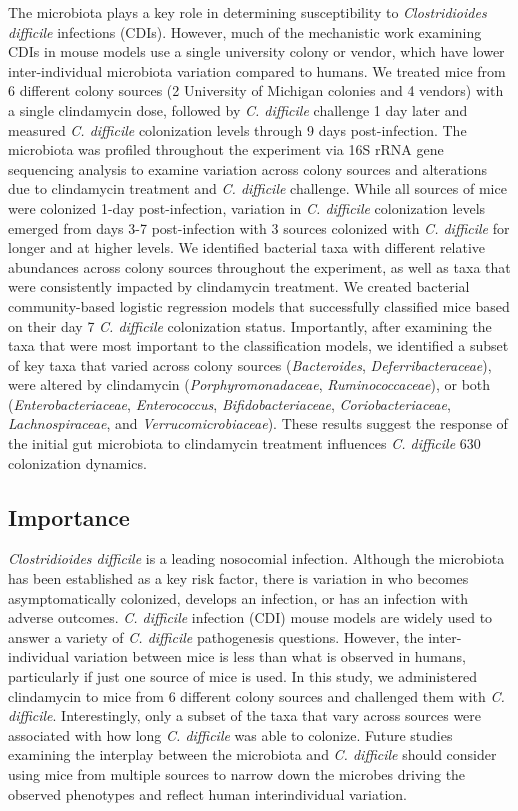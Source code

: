 \documentclass[11pt,]{article}
\begin{document}
The microbiota plays a key role in determining susceptibility to
\emph{Clostridioides difficile} infections (CDIs). However, much of the
mechanistic work examining CDIs in mouse models use a single university
colony or vendor, which have lower inter-individual microbiota variation
compared to humans. We treated mice from 6 different colony sources (2
University of Michigan colonies and 4 vendors) with a single clindamycin
dose, followed by \emph{C. difficile} challenge 1 day later and measured
\emph{C. difficile} colonization levels through 9 days post-infection.
The microbiota was profiled throughout the experiment via 16S rRNA gene
sequencing analysis to examine variation across colony sources and
alterations due to clindamycin treatment and \emph{C. difficile}
challenge. While all sources of mice were colonized 1-day
post-infection, variation in \emph{C. difficile} colonization levels
emerged from days 3-7 post-infection with 3 sources colonized with
\emph{C. difficile} for longer and at higher levels. We identified
bacterial taxa with different relative abundances across colony sources
throughout the experiment, as well as taxa that were consistently
impacted by clindamycin treatment. We created bacterial community-based
logistic regression models that successfully classified mice based on
their day 7 \emph{C. difficile} colonization status. Importantly, after
examining the taxa that were most important to the classification
models, we identified a subset of key taxa that varied across colony
sources (\emph{Bacteroides}, \emph{Deferribacteraceae}), were altered by
clindamycin (\emph{Porphyromonadaceae}, \emph{Ruminococcaceae}), or both
(\emph{Enterobacteriaceae}, \emph{Enterococcus},
\emph{Bifidobacteriaceae}, \emph{Coriobacteriaceae},
\emph{Lachnospiraceae}, and \emph{Verrucomicrobiaceae}). These results
suggest the response of the initial gut microbiota to clindamycin
treatment influences \emph{C. difficile} 630 colonization dynamics.

\subsection{Importance}\label{importance}

\emph{Clostridioides difficile} is a leading nosocomial infection.
Although the microbiota has been established as a key risk factor, there
is variation in who becomes asymptomatically colonized, develops an
infection, or has an infection with adverse outcomes. \emph{C.
difficile} infection (CDI) mouse models are widely used to answer a
variety of \emph{C. difficile} pathogenesis questions. However, the
inter-individual variation between mice is less than what is observed in
humans, particularly if just one source of mice is used. In this study,
we administered clindamycin to mice from 6 different colony sources and
challenged them with \emph{C. difficile}. Interestingly, only a subset
of the taxa that vary across sources were associated with how long
\emph{C. difficile} was able to colonize. Future studies examining the
interplay between the microbiota and \emph{C. difficile} should consider
using mice from multiple sources to narrow down the microbes driving the
observed phenotypes and reflect human interindividual variation.
\end{document}
